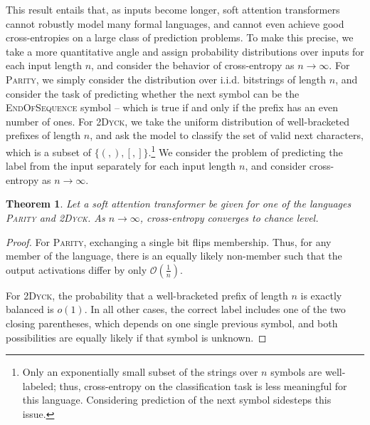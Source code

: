 \documentclass[11pt,a4paper]{article}
\newcounter{theorem}
\newtheorem{thm}[theorem]{Theorem}
\begin{document}
This result entails that, as inputs become longer, soft attention transformers cannot robustly model many formal languages, and cannot even achieve good cross-entropies on a large class of prediction problems.
To make this precise, we take a more quantitative angle and assign probability distributions over inputs for each input length $n$, and consider the behavior of cross-entropy as $n\rightarrow\infty$.
For \textsc{Parity}, we simply consider the distribution over i.i.d. bitstrings of length $n$, and consider the task of predicting whether the next symbol can be the \textsc{EndOfSequence} symbol -- which is true if and only if the prefix has an even number of ones. %
For \textsc{2Dyck}, we take the uniform distribution of well-bracketed prefixes of length $n$, and ask the model to classify the set of valid next characters, which is a subset of $\{(,),[, ]\}$.\footnote{Only an exponentially small subset of the strings over $n$ symbols are well-labeled; thus, cross-entropy on the classification task is less meaningful for this language. Considering prediction of the next symbol sidesteps this issue.}
We consider the problem of predicting the label from the input separately for each input length $n$, and consider cross-entropy as $n\rightarrow \infty$.

\begin{thm}
Let a soft attention transformer be given for one of the languages \textsc{Parity} and \textsc{2Dyck}. %
As $n\rightarrow\infty$, cross-entropy converges to chance level.
\end{thm}

\begin{proof}
For \textsc{Parity}, exchanging a single bit flips membership.
Thus, for any member of the language, there is an equally likely non-member such that the output activations differ by
only $\mathcal{O}(\frac{1}{n})$.

For \textsc{2Dyck}, the probability that a well-bracketed prefix of length $n$ is exactly balanced is $o(1)$.
In all other cases, the correct label includes one of the two closing parentheses, which depends on one single previous symbol, and both possibilities are equally likely if that symbol is unknown.
\end{proof}
\end{document}
